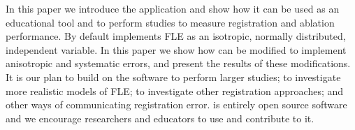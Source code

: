 In this paper we introduce the \fred application and show how it can
be used as an educational tool and to perform studies to measure registration and 
ablation performance. By default \fred
implements \gls{FLE} as an isotropic, normally distributed, independent variable. 
In this paper we show how \fred can be modified to implement anisotropic and 
systematic errors, and present the results of these modifications. 
It is our plan to build on 
the software to perform larger studies; to investigate more realistic models of \gls{FLE};
to investigate other registration approaches; and other ways of communicating registration error. 
\fred is entirely open 
source software and we encourage researchers and educators to use and contribute to it. 

